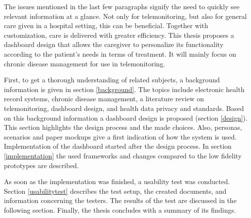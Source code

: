 The issues mentioned in the last few paragraphs signify the need to quickly see relevant information at a glance. Not only for telemonitoring, but also for general care given in a hospital setting, this can be beneficial. Together with customization, care is delivered with greater efficiency. This thesis proposes a dashboard design that allows the caregiver to personalize its functionality according to the patient's needs in terms of treatment. It will mainly focus on chronic disease management for use in telemonitoring.

First, to get a thorough understanding of related subjects, a background information is given in section \ref{background}. The topics include electronic health record systems, chronic disease management, a literature review on telemonitoring, dashboard design, and health data privacy and standards. Based on this background information a dashboard design is proposed (section \ref{design}). This section highlights the design process and the made choices. Also, personas, scenarios and paper mockups give a first indication of how the system is used. Implementation of the dashboard started after the design process. In section \ref{implementation} the used frameworks and changes compared to the low fidelity prototypes are described.

As soon as the implementation was finished, a usability test was conducted. Section \ref{usabilitytest} describes the test setup, the created documents, and information concerning the testers. The results of the test are discussed in the following section. Finally, the thesis concludes with a summary of its findings. 